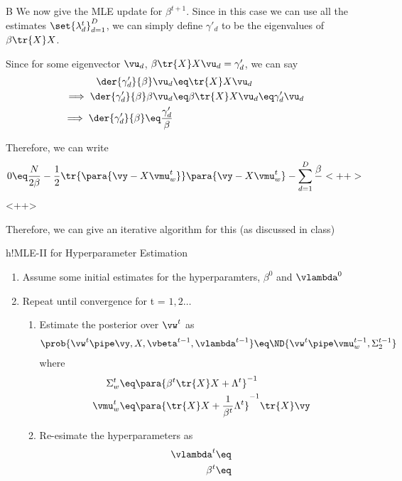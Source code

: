 \documentclass{article}
\begin{document}
\begin{question}
\begin{qpart}{B}
		We now give the MLE update for $\beta^{t + 1}$. Since in this case we can use all the estimates $\set{\lambda_{d}^t}_{d = 1}^D$, we can simply define $\gamma'_{d}$ to be the eigenvalues of $\beta \tr{X} X$.

		Since for some eigenvector $\vu_d$, $\beta \tr{X} X \vu_d = \gamma_d'$, we can say
		\begin{align*}
			\der{\gamma_d'}{\beta} \vu_d	&\eq	\tr{X} X \vu_d \\
			\implies \der{\gamma_d'}{\beta}	\beta \vu_d	&\eq	\beta \tr{X} X \vu_d	\eq	\gamma_d' \vu_d \\
			\implies \der{\gamma_d'}{\beta}	\eq	\frac{\gamma_d'}{\beta}
		\end{align*}

		Therefore, we can write
		\begin{align*}
			0	\eq	\frac{N}{2 \beta} - \frac{1}{2} \tr{\para{\vy - X \vmu_w^t}} \para{\vy - X \vmu_w^t} - \sum_{d = 1}^{D} \frac{\beta}{}<++>
		\end{align*}<++>

		Therefore, we can give an iterative algorithm for this (as discussed in class)

		\begin{algo}[0.9\textwidth]{h!}{MLE-II for Hyperparameter Estimation}

			\begin{enumerate}
				\item Assume some initial estimates for the hyperparamters, $\beta^0$ and $\vlambda^0$
				\item Repeat until convergence for t = $1, 2 \dots$
					\begin{enumerate}
						\item Estimate the posterior over $\vw^t$ as
							\begin{align*}
								\prob{\vw^t \pipe \vy, X, \vbeta^{t - 1}, \vlambda^{t - 1}}	\eq	\ND{\vw^t \pipe \vmu_w^{t - 1}, \Sigma_2^{t - 1}}
							\end{align*}
							where
							\begin{align*}
								\Sigma_w^t	&\eq	\para{\beta^t \tr{X} X + \Lambda^t}^{-1} \\
								\vmu_w^t	&\eq	\para{\tr{X} X + \frac{1}{\beta^t} \Lambda^t}^{-1} \tr{X} \vy
							\end{align*}
						\item Re-esimate the hyperparameters as
							\begin{align*}
								\vlambda^t	&\eq \\
								\beta^t		&\eq
							\end{align*}
					\end{enumerate}
			\end{enumerate}

		\end{algo}

	\end{qpart}

\end{question}
\end{document}
